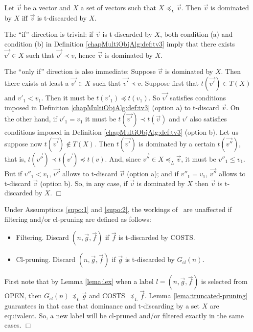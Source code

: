 \begin{lema}\label{lema:truncated-pruning} 
Let $\vec v$ be a vector and $X$ a set of vectors such that $X \preceq_L \vec v$.
Then $\vec v$ is dominated by $X$ iff $\vec v$ is t-discarded by $X$. 
\end{lema}

\begin{demo}
The ``if'' direction is trivial: if  $\vec v$ is t-discarded by $X$,
both condition (a) and condition (b) in Definition \ref{chapMultiObjAlg:def:tv3} imply that there exists $\vec{v'}\in X$
such that $\vec{v'} \prec v$, hence $\vec v$ is dominated by $X$.

The ``only if'' direction is also immediate:
Suppose $\vec v$ is dominated by $X$. Then there exists at least a $\vec{v'}\in X$ 
such that $\vec{v'}\prec v$. Suppose first that $t(\vec{v'})\in T(X)$ and
$v'_1 < v_1$. Then it must be $t(v'_1) \preceq t(v_1)$.
So $\vec{v'}$ satisfies conditions imposed in Definition \ref{chapMultiObjAlg:def:tv3} (option a)
to t-discard $\vec v$. On the other hand, if  $v'_1 = v_1$  it must be $t(\vec{v'}) \prec t(\vec v)$
and $v'$ also satisfies conditions imposed in Definition \ref{chapMultiObjAlg:def:tv3} (option b).
Let us suppose now $t(\vec{v'})\notin T(X)$. Then $t(\vec{v'})$ is dominated by a certain $t(\vec{v''})$,
that is, $t(\vec{v''}) \prec t(\vec{v'}) \preceq t(v)$.
And, since $\vec{v''}\in X \preceq_L \vec v$, it must be $v''_1 \leq v_1$. But if $v''_1 < v_1$,
$\vec{v''}$ allows to t-discard $\vec v$ (option a); and if $v''_1 = v_1$,
$\vec{v''}$ allows to t-discard $\vec v$ (option b).
So, in any case, if $\vec v$ is dominated by $X$ then $\vec v$ is t-discarded by $X$. $\Box$
\end{demo}

\begin{teorema}\label{teo:teo}
Under Assumptions \ref{supo:1} and \ref{supo:2}, the workings of \namoa \ are unaffected if filtering and/or cl-pruning  
are defined as follows:

\begin{itemize}
    \item Filtering. Discard $(n,\vec g,\vec f)$ if $\vec f$ is t-discarded by COSTS.
	 \item Cl-pruning. Discard $(n,\vec g,\vec f)$ if $\vec g$ is t-discarded by $G_{cl}(n)$.
\end{itemize}

\end{teorema}

\begin{demo}
First note that by Lemma \ref{lema:lex} when a label $l = (n,\vec g,\vec f)$ is selected from OPEN, then $G_{cl}(n)\preceq_L \vec g$ and COSTS $\preceq_L \vec f$. Lemma \ref{lema:truncated-pruning} guarantees in that case that dominance and t-discarding by a set $X$ are equivalent. So, a new label will be cl-pruned and/or filtered exactly in the same cases. $\Box$
\end{demo}

